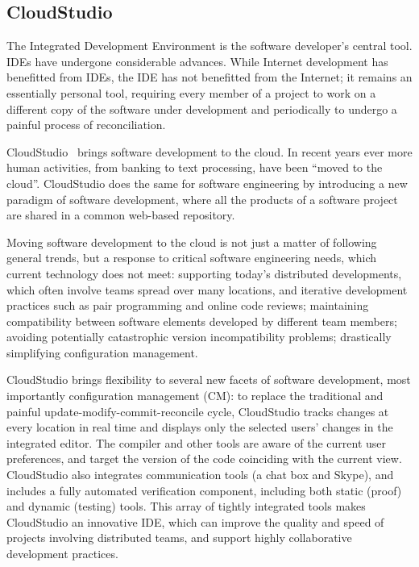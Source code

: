  \subsection{CloudStudio}

The Integrated Development Environment is the software developer's
central tool. IDEs have undergone considerable advances. While Internet development has
benefitted from IDEs, the IDE has not benefitted from the Internet; it
remains an essentially personal tool, requiring every member of a
project to work on a different copy of the software under development
and periodically to undergo a painful process of reconciliation.



CloudStudio~\cite{NordioEstlerFuriaMeyer11}  brings software
development to the cloud. In recent years ever more human
activities, from banking to text processing, have been ``moved to the
cloud''. CloudStudio does the same for software engineering by
introducing a new paradigm of software development, where all the
products of a software project are shared in a common web-based
repository.


Moving software development to the cloud is not just a matter of
following general trends, but a response to critical software
engineering needs, which current technology does not meet: supporting
today's distributed developments, which often involve teams spread
over many locations, and iterative development practices such as pair
programming and online code reviews; maintaining compatibility between
software elements developed by different team members;
avoiding potentially catastrophic version incompatibility problems;
drastically simplifying configuration management.

CloudStudio brings flexibility to several new facets of software
development, most importantly configuration management (CM): to
replace the traditional and painful update-modify-commit-reconcile
cycle, CloudStudio tracks changes at every location in real time and
displays only the selected users' changes in the integrated editor.
The compiler and other tools are aware of the current user
preferences, and target the version of the code coinciding with the
current view.  CloudStudio also integrates communication tools (a chat
box and Skype), and includes a fully automated verification component,
including both static (proof) and dynamic (testing) tools. This array of tightly 
integrated tools makes CloudStudio an innovative IDE, which
can improve the quality and speed of projects involving distributed
teams, and support highly collaborative development practices.